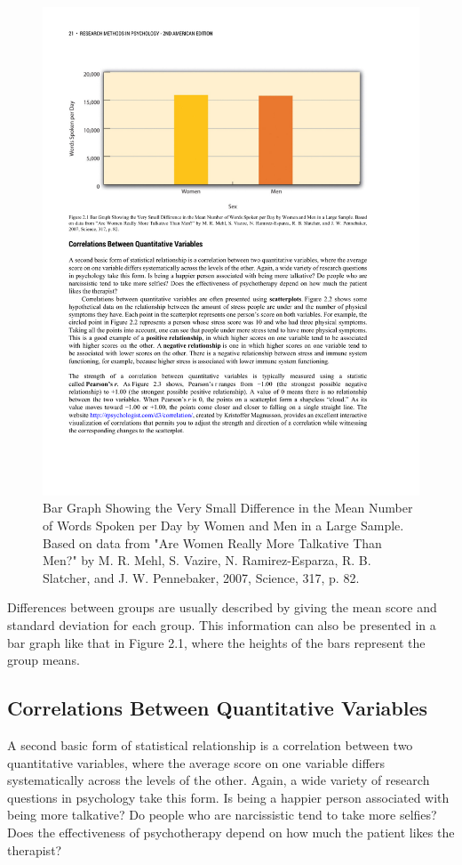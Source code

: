  \begin{figure}
       \includegraphics[width=.75\linewidth]{figures/C2F2_barchart.pdf}
       \caption{Bar Graph Showing the Very Small Difference in the Mean Number of Words Spoken per Day by Women and Men in a Large Sample. Based on data from "Are Women Really More Talkative Than Men?" by M. R. Mehl, S. Vazire, N. Ramirez-Esparza, R. B. Slatcher, and J. W. Pennebaker, 2007, Science, 317, p. 82.}
       \label{fig:Bargraph}
 \end{figure}
 
 Differences between groups are usually described by giving the mean score and standard deviation for each group. This information can also be presented in a bar graph like that in Figure 2.1, where the heights of the bars represent the group means.

\subsection{Correlations Between Quantitative Variables}
A second basic form of statistical relationship is a correlation between two quantitative variables, where the average score on one variable differs systematically across the levels of the other. Again, a wide variety of research questions in psychology take this form. Is being a happier person associated with being more talkative? Do people who are narcissistic tend to take more selfies? Does the effectiveness of psychotherapy depend on how much the patient likes the therapist?

